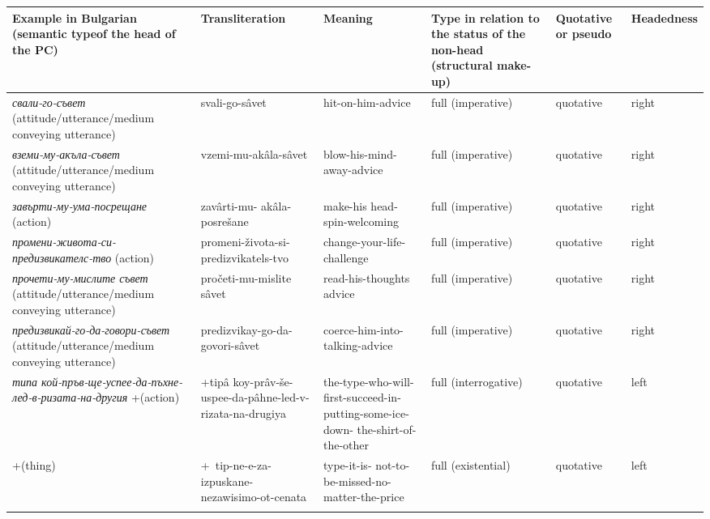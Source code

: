 \documentclass[output=paper]{LSP/langsci}
\begin{document}
\begin{sidewaystable}
\begin{tabularx}{\textwidth}{QQQQp{1.5cm}l}
\textbf{Example in Bulgarian}\footnotemark[4]
\newline 
\textbf{(semantic type}\footnotemark[5] \textbf{of the head of the PC)} & \textbf{Transliteration} & \textbf{Meaning} & \textbf{Type in relation to the  status of the non-head (structural make-up)} & \textbf{Quotative or pseudo} & \textbf{Headedness}\\
\midrule 
\textit{{свали-го-съвет}}
\newline 
(attitude/utterance/medium conveying utterance) & svali-go-sâvet & hit-on-him-advice & full  (imperative) & quotative & right\\
\textit{{вземи-му-акъла-съвет}}
\newline 
(attitude/utterance/medium conveying utterance) & vzemi-mu-akâla-sâvet & blow-his-mind-away-advice & full 
\newline 
(imperative) & quotative & right\\
\textit{{завърти-му-ума-посрещане}}
\newline 
(action) & zavârti-mu- akâla-posrešane & make-his head-spin-welcoming & full 
\newline 
(imperative) & quotative & right\\
\textit{{промени-живота-си-предизвикателс-тво}}
\newline 
(action) & promeni-života-si-predizvikatels-tvo & change-your-life-challenge & full 
\newline 
(imperative) & quotative & right\\
\textit{{прочети-му-мислите съвет}}
\newline 
(attitude/utterance/medium conveying utterance) & pročeti-mu-mislite sâvet & read-his-thoughts advice & full 
\newline 
(imperative) & quotative & right\\
\textit{{предизвикай-го-да-говори-съвет}}
\newline 
(attitude/utterance/medium conveying utterance) & predizvikay-go-da-govori-sâvet & coerce-him-into-talking-advice & full 
\newline 
(imperative) & quotative & right\\
\textit{{типа кой-пръв-ще-успее-да-пъхне-лед-в-ризата-на-другия}}
\newline 
+(action) & +tipâ koy-prâv-še-uspee-da-pâhne-led-v-rizata-na-drugiya & the-type-who-will-first-succeed-in-putting-some-ice-down- the-shirt-of-the-other & full 
\newline 
(interrogative) & quotative & left\\
+(thing) & +\footnotemark[6]~tip-ne-e-za-izpuskane-nezawisimo-ot-cenata & type-it-is- not-to-be-missed-no-matter-the-price & full 
\newline 
(existential) & quotative & left\\
\lspbottomrule
\end{tabularx}
\end{sidewaystable}
\end{document}
